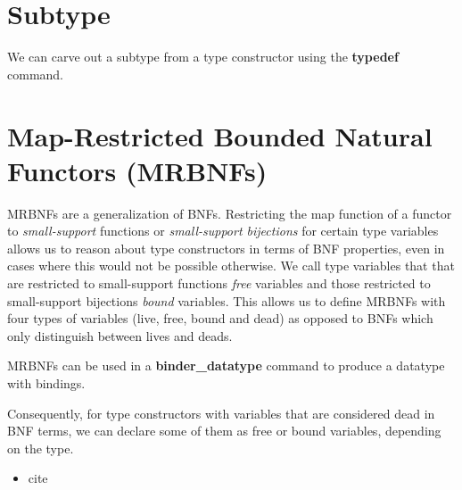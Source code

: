   \section{Subtype}
    We can carve out a subtype from a type constructor using the \textbf{typedef} command. 

  \section{Map-Restricted Bounded Natural Functors (MRBNFs)}
    \acp{MRBNF} are a generalization of \acp{BNF}. Restricting the \textsf{map} function of a functor to \textit{small-support} functions or \textit{small-support bijections} for certain type variables allows us to reason about type constructors in terms of \ac{BNF} properties, even in cases where this would not be possible otherwise. We call type variables that that are restricted to small-support functions \textit{free} variables  and those restricted to small-support bijections \textit{bound} variables. This allows us to define \acp{MRBNF} with four types of variables (live, free, bound and dead) as opposed to \acp{BNF} which only distinguish between lives and deads. 

    \acp{MRBNF} can be used in a \textbf{binder\_datatype} command to produce a datatype with bindings. 
    
    Consequently, for type constructors with variables that are considered dead in \ac{BNF} terms, we can declare some of them as free or bound variables, depending on the type.

    
  \begin{itemize}
    \item cite \cite{blanchette2019bindings}
  \end{itemize}

